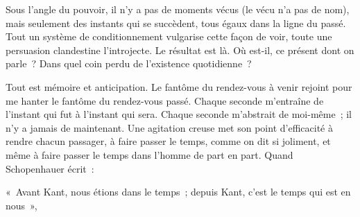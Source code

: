 \documentclass[french,twoside]{book} %
\newcommand{\astermono}{\medskip\centerline{\color{rubric}\large\selectfont{\syms ✻}}\medskip\par}%
\newenvironment{quoteblock}%
  {\begin{quoting}}
  {\end{quoting}}
\newenvironment{quotebar}{%
    \def\FrameCommand{{\color{rubric!10!}\vrule width 0.5em} \hspace{0.9em}}%
    \def\OuterFrameSep{\itemsep} %
    \MakeFramed {\advance\hsize-\width \FrameRestore}
  }%
  {%
    \endMakeFramed
  }
\renewenvironment{quoteblock}%
  {%
    \savenotes
    \setstretch{0.9}
    \normalfont
    \begin{quotebar}
  }
  {%
    \end{quotebar}
    \spewnotes
  }
\begin{document}
\astermono

\noindent Sous l’angle du pouvoir, il n’y a pas de moments vécus (le vécu n’a pas de nom), mais seulement des instants qui se succèdent, tous égaux dans la ligne du passé. Tout un système de conditionnement vulgarise cette façon de voir, toute une persuasion clandestine l’introjecte. Le résultat est là. Où est-il, ce présent dont on parle ? Dans quel coin perdu de l’existence quotidienne ?\par
Tout est mémoire et anticipation. Le fantôme du rendez-vous à venir rejoint pour me hanter le fantôme du rendez-vous passé. Chaque seconde m’entraîne de l’instant qui fut à l’instant qui sera. Chaque seconde m’abstrait de moi-même ; il n’y a jamais de maintenant. Une agitation creuse met son point d’efficacité à rendre chacun passager, à faire passer le temps, comme on dit si joliment, et même à faire passer le temps dans l’homme de part en part. Quand Schopenhauer écrit :\par

\begin{quoteblock}
\noindent « Avant Kant, nous étions dans le temps ; depuis Kant, c’est le temps qui est en nous »,\end{quoteblock}
\end{document}
